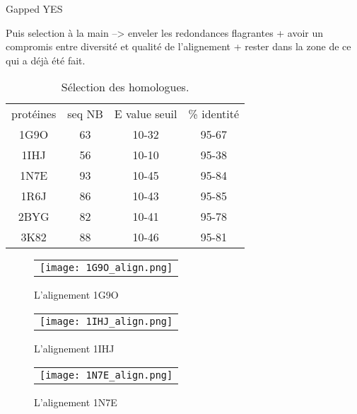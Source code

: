 Gapped YES


Puis selection à la main -->
enveler les redondances flagrantes
 + avoir un compromis entre diversité et qualité de l'alignement
 + rester dans la zone de ce qui a déjà été fait.



    \begin{table}[!htbp]
      \centering

      \begin{tabular}{cccc}

        \toprule
        protéines & seq NB & E value seuil & \% identité \\
        \cmidrule{1-4}
     1G9O  & 63  &    10-32  &  95-67 \\
     1IHJ  & 56  &    10-10  &  95-38 \\
     1N7E  & 93  &    10-45  &  95-84 \\
     1R6J  & 86  &    10-43  &  95-85 \\
     2BYG  & 82  &    10-41  &  95-78 \\
     3K82  & 88  &    10-46  &  95-81 \\


        \bottomrule


      \end{tabular}      
      \caption{Sélection des homologues.}
\label{tab:freq_AA_ALL}      
    \end{table}


    \clearpage

   \begin{figure}[t]
     \centering
     \begin{tabular}{c}
       \texttt{[image: 1G9O\_align.png]} \\
     \end{tabular}
     \caption{L'alignement 1G9O }
\label{graph:convEref}
   \end{figure}

    \clearpage

   \begin{figure}[t]
     \centering
     \begin{tabular}{c}
       \texttt{[image: 1IHJ\_align.png]} \\
     \end{tabular}
     \caption{L'alignement 1IHJ }
\label{graph:convEref}
   \end{figure}

    \clearpage

   \begin{figure}[t]
     \centering
     \begin{tabular}{c}
       \texttt{[image: 1N7E\_align.png]} \\
     \end{tabular}
     \caption{L'alignement 1N7E }
\label{graph:convEref}
   \end{figure}

